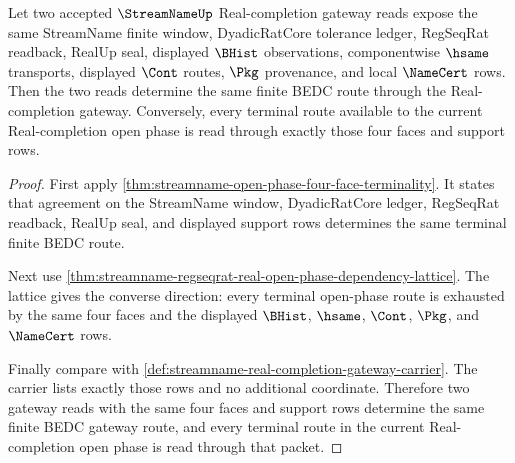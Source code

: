 \begin{theorem}
\label{thm:streamname-real-completion-gateway-terminality}
Let two accepted $\StreamNameUp$ Real-completion gateway reads expose the same StreamName finite window, DyadicRatCore tolerance ledger, RegSeqRat readback, RealUp seal, displayed $\BHist$ observations, componentwise $\hsame$ transports, displayed $\Cont$ routes, $\Pkg$ provenance, and local $\NameCert$ rows. Then the two reads determine the same finite BEDC route through the Real-completion gateway. Conversely, every terminal route available to the current Real-completion open phase is read through exactly those four faces and support rows.
\end{theorem}
\begin{proof}
First apply \autoref{thm:streamname-open-phase-four-face-terminality}. It states that agreement on the StreamName window, DyadicRatCore ledger, RegSeqRat readback, RealUp seal, and displayed support rows determines the same terminal finite BEDC route.

Next use \autoref{thm:streamname-regseqrat-real-open-phase-dependency-lattice}. The lattice gives the converse direction: every terminal open-phase route is exhausted by the same four faces and the displayed $\BHist$, $\hsame$, $\Cont$, $\Pkg$, and $\NameCert$ rows.

Finally compare with \autoref{def:streamname-real-completion-gateway-carrier}. The carrier lists exactly those rows and no additional coordinate. Therefore two gateway reads with the same four faces and support rows determine the same finite BEDC gateway route, and every terminal route in the current Real-completion open phase is read through that packet.
\end{proof}

